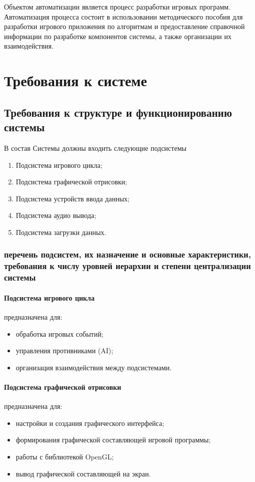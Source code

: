 Объектом автоматизации является процесс разработки игровых программ. Автоматизация процесса состоит в 
использовании методического пособия для разработки игрового приложения по алгоритмам и предоставление 
справочной информации по разработке компонентов системы, а также организации их взаимодействия.


\chapter{Требования к системе}
\section{Требования к структуре и функционированию системы}
В состав Системы должны входить следующие подсистемы
\begin{enumerate}
    \item Подсистема игрового цикла;
    \item Подсистема графической отрисовки;
    \item Подсистема устройств ввода данных;
    \item Подсистема аудио вывода;
    \item Подсистема загрузки данных.
\end{enumerate}

\subsection{перечень подсистем, их назначение и основные характеристики, требования к числу 
    уровней иерархии и степени централизации системы}
\subsubsection{Подсистема игрового цикла}
предназначена для:
\begin{itemize}
    \item обработка игровых событий;
    \item управления противниками (AI);
    \item организация взаимодействия между подсистемами.
\end{itemize}

\subsubsection{Подсистема графической отрисовки}
предназначена для:
\begin{itemize}
    \item настройки и создания графического интерфейса;
    \item формирования графической составляющей игровой программы;
    \item работы с библиотекой OpenGL;
    \item вывод графической составляющей на экран.
\end{itemize}

